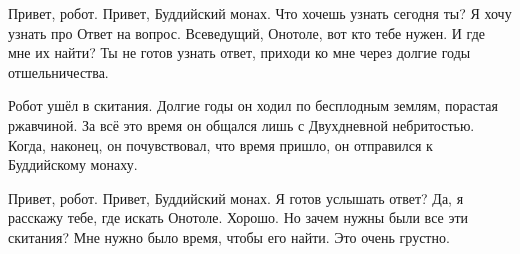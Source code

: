 {\small
\begin{dialog}
\X Привет, робот.
\R Привет, Буддийский монах.
\X Что хочешь узнать сегодня ты?
\R Я хочу узнать про Ответ на вопрос.
\X Всеведущий, Онотоле, вот кто тебе нужен.
\R И где мне их найти?
\X Ты не готов узнать ответ, приходи ко мне через долгие годы отшельничества.
\end{dialog}

\begin{monolog}
Робот ушёл в скитания. Долгие годы он ходил по бесплодным землям, порастая ржавчиной. За всё это время он общался лишь с Двухдневной небритостью. Когда, наконец, он почувствовал, что время пришло, он отправился к Буддийскому монаху.
\end{monolog}

\begin{dialog}
\X Привет, робот.
\R Привет, Буддийский монах. Я готов услышать ответ?
\X Да, я расскажу тебе, где искать Онотоле.
\R Хорошо. Но зачем нужны были все эти скитания?
\X Мне нужно было время, чтобы его найти.
\R Это очень грустно. %
\end{dialog}
}